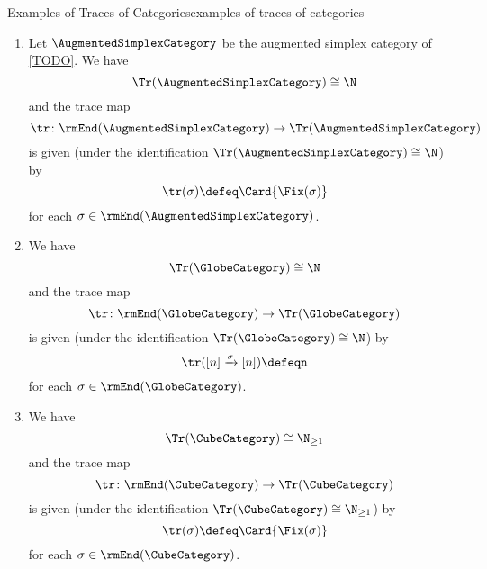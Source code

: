 \begin{example}{Examples of Traces of Categories}{examples-of-traces-of-categories}
\begin{enumerate}
\[            \]%
            for each $\sigma\in\rmEnd(\SimplexCategory)$, i.e.\ by sending an endomorphism $\sigma\colon[n]\to[n]$ of $\SimplexCategory$ to the cardinality of its set of fixed points.
        \item\label{examples-of-traces-of-categories-the-trace-of-the-augmented-simplex-category}Let $\AugmentedSimplexCategory$ be the augmented simplex category of \cref{TODO}. We have
            \[
                \Tr(\AugmentedSimplexCategory)%
                \cong%
                \N%
            \]%
            and the trace map
            \[
                \tr%
                \colon%
                \rmEnd(\AugmentedSimplexCategory)%
                \to%
                \Tr(\AugmentedSimplexCategory)%
            \]%
            is given (under the identification $\Tr(\AugmentedSimplexCategory)\cong\N$) by
            \[
                \tr(\sigma)%
                \defeq%
                \Card{\Fix(\sigma)}%
            \]%
            for each $\sigma\in\rmEnd(\AugmentedSimplexCategory)$.
        \item\label{examples-of-traces-of-categories-the-trace-of-the-cube-category}We have
            \[
                \Tr(\GlobeCategory)%
                \cong%
                \N%
            \]%
            and the trace map
            \[
                \tr%
                \colon%
                \rmEnd(\GlobeCategory)%
                \to%
                \Tr(\GlobeCategory)%
            \]%
            is given (under the identification $\Tr(\GlobeCategory)\cong\N$) by
            \[
                \tr([n]\xrightarrow{\sigma}[n])%
                \defeq%
                n%
            \]%
            for each $\sigma\in\rmEnd(\GlobeCategory)$.
        \item\label{examples-of-traces-of-categories-the-trace-of-the-cube-category}We have
            \[
                \Tr(\CubeCategory)%
                \cong%
                \N_{\geq1}%
            \]%
            and the trace map
            \[
                \tr%
                \colon%
                \rmEnd(\CubeCategory)%
                \to%
                \Tr(\CubeCategory)%
            \]%
            is given (under the identification $\Tr(\CubeCategory)\cong\N_{\geq1}$) by
            \[
                \tr(\sigma)%
                \defeq%
                \Card{\Fix(\sigma)}%
            \]%
            for each $\sigma\in\rmEnd(\CubeCategory)$.

\end{enumerate}
\end{example}
